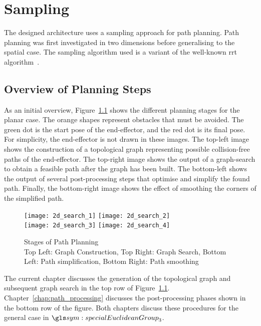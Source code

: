 \chapter{Sampling}%
\label{chap:sampling}

	The designed architecture uses a sampling approach for path planning. Path
	planning was first investigated in two dimensions before generalising to the
	spatial case. The sampling algorithm used is a variant
	of the well-known \gls{rrt}
	algorithm~\cite{bib:planning:rapidly-exploring_random_trees_a_new_tool_for_path_planning}.

	\section{Overview of Planning Steps}

		As an initial overview, Figure~\ref{fig:path_planning_in_2d} shows the
		different planning stages for the planar case. The orange shapes
		represent obstacles that must be avoided. The green dot is the start
		pose of the end-effector, and the red dot is its final pose. For
		simplicity, the end-effector is not drawn in these images. The top-left
		image shows the construction of a topological graph representing
		possible collision-free paths of the end-effector. The top-right image
		shows the output of a graph-search to obtain a feasible path after the
		graph has been built. The bottom-left shows the output of several
		post-processing steps that optimise and simplify the found path.
		Finally, the bottom-right image shows the effect of smoothing the
		corners of the simplified path.

		\begin{figure}[htb]
			\centering
				\texttt{[image: 2d\_search\_1]}%
				\texttt{[image: 2d\_search\_2]}\\
				\texttt{[image: 2d\_search\_3]}%
				\texttt{[image: 2d\_search\_4]}
			\caption[Stages of Path Planning]
				{
					Stages of Path Planning\\
					Top Left: Graph Construction,
					Top Right: Graph Search,
					Bottom Left: Path simplification,
					Bottom Right: Path smoothing
				}
			\label{fig:path_planning_in_2d}
		\end{figure}

		The current chapter discusses the generation of the topological graph
		and subsequent graph search in the top row of
		Figure~\ref{fig:path_planning_in_2d}. Chapter~\ref{chap:path_processing}
		discusses the post-processing phases shown in the bottom row of the
		figure.  Both chapters discuss these procedures for the general case in
		$\specialEuclideanGroup{3}$.

	
	
	
	

